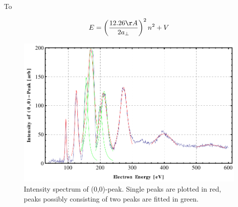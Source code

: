 \documentclass[a4paper,10pt]{scrartcl}
\begin{document}
To 

\begin{equation}
E = \left( \frac{12.26\AA}{2a_{\perp}} \right)^{2} n^{2} + V
\end{equation}

\begin{figure}
\centering
\includegraphics[scale=0.55]{img/iv}
\caption{Intensity spectrum of (0,0)-peak. Single peaks are plotted in red, peaks possibly consisting of two peaks are fitted in green.\label{fig:iv}}
\end{figure}
\end{document}
